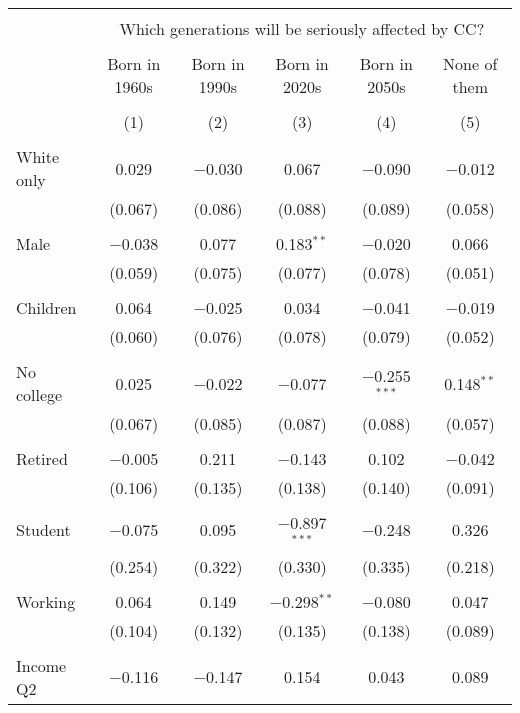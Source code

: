 
\begin{tabular}{@{\extracolsep{5pt}}lccccc} 
\\[-1.8ex]\hline 
\hline \\[-1.8ex] 
 & \multicolumn{5}{c}{Which generations will be seriously affected by CC?} \\ 
\cline{2-6} 
\\[-1.8ex] & Born in 1960s & Born in 1990s & Born in 2020s & Born in 2050s & None of them \\ 
\\[-1.8ex] & (1) & (2) & (3) & (4) & (5)\\ 
\hline \\[-1.8ex] 
 White only & 0.029 & $-$0.030 & 0.067 & $-$0.090 & $-$0.012 \\ 
  & (0.067) & (0.086) & (0.088) & (0.089) & (0.058) \\ 
  & & & & & \\ 
 Male & $-$0.038 & 0.077 & 0.183$^{**}$ & $-$0.020 & 0.066 \\ 
  & (0.059) & (0.075) & (0.077) & (0.078) & (0.051) \\ 
  & & & & & \\ 
 Children & 0.064 & $-$0.025 & 0.034 & $-$0.041 & $-$0.019 \\ 
  & (0.060) & (0.076) & (0.078) & (0.079) & (0.052) \\ 
  & & & & & \\ 
 No college & 0.025 & $-$0.022 & $-$0.077 & $-$0.255$^{***}$ & 0.148$^{**}$ \\ 
  & (0.067) & (0.085) & (0.087) & (0.088) & (0.057) \\ 
  & & & & & \\ 
 Retired & $-$0.005 & 0.211 & $-$0.143 & 0.102 & $-$0.042 \\ 
  & (0.106) & (0.135) & (0.138) & (0.140) & (0.091) \\ 
  & & & & & \\ 
 Student & $-$0.075 & 0.095 & $-$0.897$^{***}$ & $-$0.248 & 0.326 \\ 
  & (0.254) & (0.322) & (0.330) & (0.335) & (0.218) \\ 
  & & & & & \\ 
 Working & 0.064 & 0.149 & $-$0.298$^{**}$ & $-$0.080 & 0.047 \\ 
  & (0.104) & (0.132) & (0.135) & (0.138) & (0.089) \\ 
  & & & & & \\ 
 Income Q2 & $-$0.116 & $-$0.147 & 0.154 & 0.043 & 0.089 \\ 

\end{tabular}
